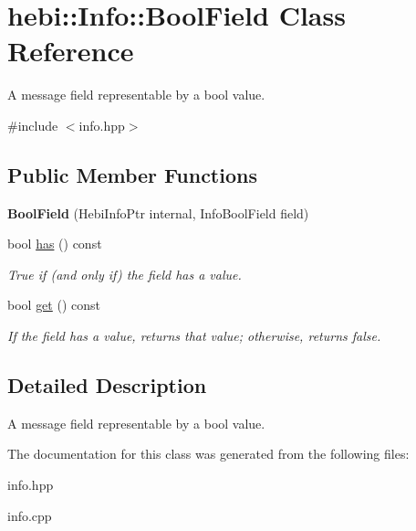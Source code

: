 \hypertarget{classhebi_1_1Info_1_1BoolField}{}\section{hebi\+:\+:Info\+:\+:Bool\+Field Class Reference}
\label{classhebi_1_1Info_1_1BoolField}


A message field representable by a bool value.  




{\ttfamily \#include $<$info.\+hpp$>$}

\subsection*{Public Member Functions}
\begin{DoxyCompactItemize}
\item 
{\bfseries Bool\+Field} (Hebi\+Info\+Ptr internal, Info\+Bool\+Field field)\hypertarget{classhebi_1_1Info_1_1BoolField_ae4a42c5663dbaced0bfebd056cec2b78}{}\label{classhebi_1_1Info_1_1BoolField_ae4a42c5663dbaced0bfebd056cec2b78}

\item 
bool \hyperlink{classhebi_1_1Info_1_1BoolField_a336e3ae3693aafb2f98a3dc39e3434c7}{has} () const \hypertarget{classhebi_1_1Info_1_1BoolField_a336e3ae3693aafb2f98a3dc39e3434c7}{}\label{classhebi_1_1Info_1_1BoolField_a336e3ae3693aafb2f98a3dc39e3434c7}

\begin{DoxyCompactList}\small\item\em True if (and only if) the field has a value. \end{DoxyCompactList}\item 
bool \hyperlink{classhebi_1_1Info_1_1BoolField_a1a28208c979d48b4dac8521d8c229974}{get} () const \hypertarget{classhebi_1_1Info_1_1BoolField_a1a28208c979d48b4dac8521d8c229974}{}\label{classhebi_1_1Info_1_1BoolField_a1a28208c979d48b4dac8521d8c229974}

\begin{DoxyCompactList}\small\item\em If the field has a value, returns that value; otherwise, returns false. \end{DoxyCompactList}\end{DoxyCompactItemize}


\subsection{Detailed Description}
A message field representable by a bool value. 

The documentation for this class was generated from the following files\+:\begin{DoxyCompactItemize}
\item 
info.\+hpp\item 
info.\+cpp\end{DoxyCompactItemize}
